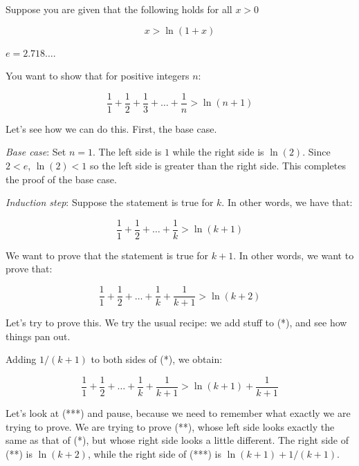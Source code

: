 \documentclass{amsart}
\begin{document}
Suppose you are given that the following holds for all $x > 0$

\begin{equation*}
  x > \ln(1 + x) \tag{A}
\end{equation*}

$e = 2.718 \dots$.
 
You want to show that for positive integers $n$:

\begin{equation*}
  \frac{1}{1} + \frac{1}{2} + \frac{1}{3} + \dots + \frac{1}{n} > \ln(n + 1)
\end{equation*}

Let's see how we can do this. First, the base case.

{\em Base case}: Set $n = 1$. The left side is $1$ while the right
side is $\ln(2)$. Since $2 < e$, $\ln(2) < 1$ so the left side is
greater than the right side. This completes the proof of the base
case.

{\em Induction step}: Suppose the statement is true for $k$. In other
words, we have that:

\begin{equation*}
  \frac{1}{1} + \frac{1}{2} + \dots + \frac{1}{k} > \ln(k + 1) \tag{*}
\end{equation*}

We want to prove that the statement is true for $k + 1$. In other
words, we want to prove that:

\begin{equation*}
  \frac{1}{1} + \frac{1}{2} + \dots + \frac{1}{k} + \frac{1}{k+1} > \ln(k + 2) \tag{**}
\end{equation*}

Let's try to prove this. We try the usual recipe: we add stuff to (*),
and see how things pan out.

Adding $1/(k+1)$ to both sides of (*), we obtain:

\begin{equation*}
  \frac{1}{1} + \frac{1}{2} + \dots + \frac{1}{k} + \frac{1}{k + 1} > \ln(k + 1) + \frac{1}{k + 1} \tag{***}
\end{equation*}

Let's look at (***) and pause, because we need to remember what
exactly we are trying to prove. We are trying to prove (**), whose
left side looks exactly the same as that of (*), but whose right
side looks a little different. The right side of (**) is $\ln(k +
2)$, while the right side of (***) is $\ln(k+1) + 1/(k + 1)$.
\end{document}
